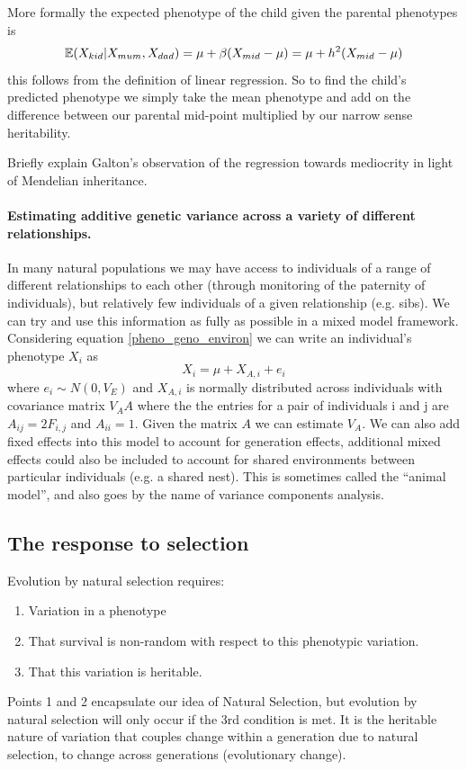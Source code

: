 More formally the expected phenotype of the child given the parental
phenotypes is
\begin{equation}
\mathbb{E}(X_{kid} | X_{mum},X_{dad}) = \mu +
\beta(X_{mid} - \mu) =\mu + h^2(X_{mid} - \mu)  \label{predict_kid}
\end{equation}
this follows from the definition of linear regression. So to find the
child's predicted phenotype we simply take the mean phenotype and add
on the difference between our parental mid-point multiplied by our
narrow sense heritability. \\


\begin{question}
Briefly explain Galton’s observation of the regression towards
mediocrity in light of Mendelian inheritance. 
\end{question}

\paragraph{Estimating additive genetic variance across a variety of
  different relationships.}

In many natural populations we may have access to individuals of a
range of different relationships to each other (through monitoring
of the paternity of individuals), but relatively few individuals of a
given relationship (e.g. sibs). We can try and use this information as
fully as possible in a mixed model framework. Considering equation
\ref{pheno_geno_environ} we can write an individual's phenotype $X_i$
 as 
\begin{equation}
X_i =  \mu  + X_{A,i} + e_i 
\end{equation}
where $e_i \sim N(0,V_E)$ and $X_{A,i}$ is normally distributed across
individuals with covariance matrix $V_A A$ where the the entries for
a pair of individuals i and j are 
$A_{ij}= 2 F_{i,j}$ and $A_{ii}= 1$. Given the matrix $A$ we can estimate $V_A$. We can
also add fixed effects into this model to account for generation
effects, additional mixed effects could also be included to account
for shared environments between particular individuals (e.g. a shared nest).
This is sometimes called the ``animal model'', and also goes by the
name of variance components analysis.


\subsection{The response to selection}
Evolution by natural selection requires:
\begin{enumerate}
\item Variation in a phenotype
\item That survival is non-random with respect to this phenotypic
variation.
\item That this variation is heritable.
\end{enumerate}
Points 1 and 2 encapsulate our idea of Natural Selection, but evolution by natural
selection will only occur if the 3rd condition is met. It is the
heritable nature of variation that couples change within a generation
due to natural selection, to change across generations (evolutionary
change). \\

